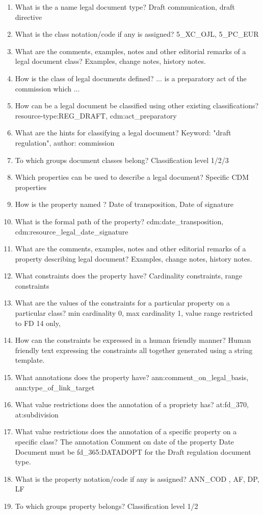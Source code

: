 \begin{enumerate}
\tightlist
\item
  What is the a name legal document type? Draft communication, draft
  directive
\item
  What is the class notation/code if any is assigned? 5\_XC\_OJL,
  5\_PC\_EUR
\item
  What are the comments, examples, notes and other editorial remarks of
  a legal document class? Examples, change notes, history notes.
\item
  How is the class of legal documents defined? ... is a preparatory act
  of the commission which ...
\item
  How can be a legal document be classified using other existing
  classifications? resource-type:REG\_DRAFT, cdm:act\_preparatory
\item
  What are the hints for classifying a legal document? Keyword: "draft
  regulation", author: commission
\item
  To which groups document classes belong? Classification level 1/2/3
\item
  Which properties can be used to describe a legal document? Specific
  CDM properties
\item
  How is the property named ? Date of transposition, Date of signature
\item
  What is the formal path of the property? cdm:date\_transposition,
  cdm:resource\_legal\_date\_signature
\item
  What are the comments, examples, notes and other editorial remarks of
  a property describing legal document? Examples, change notes, history
  notes.
\item
  What constraints does the property have? Cardinality constraints,
  range constraints
\item
  What are the values of the constraints for a particular property on a
  particular class? min cardinality 0, max cardinality 1, value range
  restricted to FD 14 only,
\item
  How can the constraints be expressed in a human friendly manner? Human
  friendly text expressing the constraints all together generated using
  a string template.
\item
  What annotations does the property have?
  ann:comment\_on\_legal\_basis, ann:type\_of\_link\_target
\item
  What value restrictions does the annotation of a propriety has?
  at:fd\_370, at:subdivision
\item
  What value restrictions does the annotation of a specific property on
  a specific class? The annotation Comment on date of the property Date
  Document must be fd\_365:DATADOPT for the Draft regulation document
  type.
\item
  What is the property notation/code if any is assigned? ANN\_COD , AF,
  DP, LF
\item
  To which groups property belongs? Classification level 1/2
\end{enumerate}
